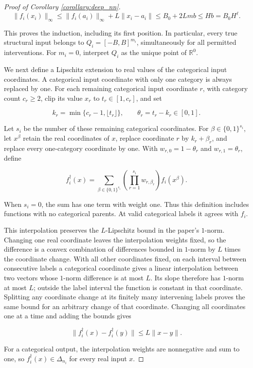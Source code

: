 \begin{proof}[Proof of Corollary \ref{corollary:deep_nn}]
\[
\|f_i(x_i)\|_\infty\leqslant\|f_i(a_i)\|_\infty+L\|x_i-a_i\|\leqslant B_0+2Lmb\leqslant Hb=B_0H^\ell.
\]

This proves the induction, including its first position. In particular, every true structural input belongs to $Q_i=[-B,B]^{m_i}$, simultaneously for all permitted interventions. For $m_i=0$, interpret $Q_i$ as the unique point of $\mathbb R^0$. 

We next define a Lipschitz extension to real values of the categorical input coordinates. A categorical input coordinate with only one category is always replaced by one. For each remaining categorical input coordinate $r$, with category count $c_r\geqslant2$, clip its value $x_r$ to $t_r\in[1,c_r]$, and set

\[
k_r=\min\{c_r-1,\lfloor t_r\rfloor\},\qquad \theta_r=t_r-k_r\in[0,1].
\]

Let $s_i$ be the number of these remaining categorical coordinates. For $\beta\in\{0,1\}^{s_i}$, let $x^\beta$ retain the real coordinates of $x$, replace coordinate $r$ by $k_r+\beta_r$, and replace every one-category coordinate by one. With $w_{r,0}=1-\theta_r$ and $w_{r,1}=\theta_r$, define

\[
f_i^\dagger(x)=\sum_{\beta\in\{0,1\}^{s_i}}\left(\prod_{r=1}^{s_i}w_{r,\beta_r}\right)f_i(x^\beta).
\]

When $s_i=0$, the sum has one term with weight one. Thus this definition includes functions with no categorical parents. At valid categorical labels it agrees with $f_i$. 

This interpolation preserves the $L$-Lipschitz bound in the paper's $1$-norm. Changing one real coordinate leaves the interpolation weights fixed, so the difference is a convex combination of differences bounded in $1$-norm by $L$ times the coordinate change. With all other coordinates fixed, on each interval between consecutive labels a categorical coordinate gives a linear interpolation between two vectors whose $1$-norm difference is at most $L$. Its slope therefore has $1$-norm at most $L$; outside the label interval the function is constant in that coordinate. Splitting any coordinate change at its finitely many intervening labels proves the same bound for an arbitrary change of that coordinate. Changing all coordinates one at a time and adding the bounds gives

\[
\|f_i^\dagger(x)-f_i^\dagger(y)\|\leqslant L\|x-y\|.
\]

For a categorical output, the interpolation weights are nonnegative and sum to one, so $f_i^\dagger(x)\in\Delta_{n_i}$ for every real input $x$. 


\end{proof}
